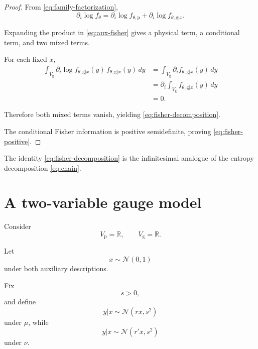 \documentclass[11pt]{article}
\theoremstyle{remark}
\newcommand{\R}{\mathbb{R}}
\begin{document}
\begin{proof}
From \eqref{eq:family-factorization},
\begin{equation}
\partial_i\log f_\theta
=
\partial_i\log f_{\theta,\mathrm p}
+
\partial_i\log f_{\theta,\mathrm g|x}.
\end{equation}

Expanding the product in
\eqref{eq:aux-fisher} gives a physical term, a conditional
term, and two mixed terms.

For each fixed \(x\),
\begin{align}
\int_{V_{\mathrm g}}
\partial_i
\log f_{\theta,\mathrm g|x}(y)
\,
f_{\theta,\mathrm g|x}(y)
\,dy
&=
\int_{V_{\mathrm g}}
\partial_i
f_{\theta,\mathrm g|x}(y)
\,dy
\nonumber\\
&=
\partial_i
\int_{V_{\mathrm g}}
f_{\theta,\mathrm g|x}(y)
\,dy
\nonumber\\
&=
0.
\end{align}

Therefore both mixed terms vanish, yielding
\eqref{eq:fisher-decomposition}.

The conditional Fisher information is positive
semidefinite, proving \eqref{eq:fisher-positive}.
\end{proof}

The identity
\eqref{eq:fisher-decomposition} is the infinitesimal analogue
of the entropy decomposition \eqref{eq:chain}.

\section{A two-variable gauge model}

Consider
\begin{equation}
V_{\mathrm p}
=
\R,
\qquad
V_{\mathrm g}
=
\R.
\end{equation}

Let
\begin{equation}
x\sim\mathcal N(0,1)
\end{equation}
under both auxiliary descriptions.

Fix
\begin{equation}
s>0,
\end{equation}
and define
\begin{equation}
y|x
\sim
\mathcal N(rx,s^2)
\label{eq:first-conditional}
\end{equation}
under \(\mu\), while
\begin{equation}
y|x
\sim
\mathcal N(r'x,s^2)
\label{eq:second-conditional}
\end{equation}
under \(\nu\).
\end{document}
